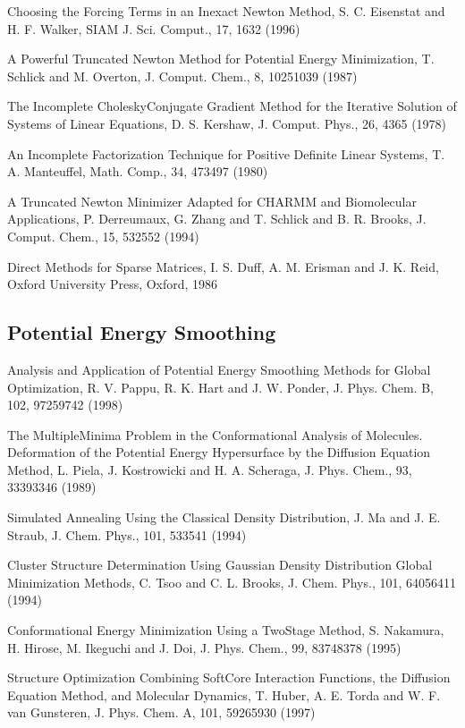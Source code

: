 \documentclass[letterpaper,11pt,english]{sphinxmanual}
\begin{document}
Choosing the Forcing Terms in an Inexact Newton Method, S. C. Eisenstat and H. F. Walker, SIAM J. Sci. Comput., 17, 16\sphinxhyphen{}32 (1996)

A Powerful Truncated Newton Method for Potential Energy Minimization, T. Schlick and M. Overton, J. Comput. Chem., 8, 1025\sphinxhyphen{}1039 (1987)

The Incomplete Cholesky\sphinxhyphen{}Conjugate Gradient Method for the Iterative Solution of Systems of Linear Equations, D. S. Kershaw, J. Comput. Phys., 26, 43\sphinxhyphen{}65 (1978)

An Incomplete Factorization Technique for Positive Definite Linear Systems, T. A. Manteuffel, Math. Comp., 34, 473\sphinxhyphen{}497 (1980)

A Truncated Newton Minimizer Adapted for CHARMM and Biomolecular Applications, P. Derreumaux, G. Zhang and T. Schlick and B. R. Brooks, J. Comput. Chem., 15, 532\sphinxhyphen{}552 (1994)

Direct Methods for Sparse Matrices, I. S. Duff, A. M. Erisman and J. K. Reid, Oxford University Press, Oxford, 1986


\subsection{Potential Energy Smoothing}
\label{\detokenize{text/references:potential-energy-smoothing}}
Analysis and Application of Potential Energy Smoothing Methods for Global Optimization, R. V. Pappu, R. K. Hart and J. W. Ponder, J. Phys. Chem. B, 102, 9725\sphinxhyphen{}9742 (1998)

The Multiple\sphinxhyphen{}Minima Problem in the Conformational Analysis of Molecules. Deformation of the Potential Energy Hypersurface by the Diffusion Equation Method, L. Piela, J. Kostrowicki and H. A. Scheraga, J. Phys. Chem., 93, 3339\sphinxhyphen{}3346 (1989)

Simulated Annealing Using the Classical Density Distribution, J. Ma and J. E. Straub, J. Chem. Phys., 101, 533\sphinxhyphen{}541 (1994)

Cluster Structure Determination Using Gaussian Density Distribution Global Minimization Methods, C. Tsoo and C. L. Brooks, J. Chem. Phys., 101, 6405\sphinxhyphen{}6411 (1994)

Conformational Energy Minimization Using a Two\sphinxhyphen{}Stage Method, S. Nakamura, H. Hirose, M. Ikeguchi and J. Doi, J. Phys. Chem., 99, 8374\sphinxhyphen{}8378 (1995)

Structure Optimization Combining Soft\sphinxhyphen{}Core Interaction Functions, the Diffusion Equation Method, and Molecular Dynamics, T. Huber, A. E. Torda and W. F. van Gunsteren, J. Phys. Chem. A, 101, 5926\sphinxhyphen{}5930 (1997)
\end{document}
